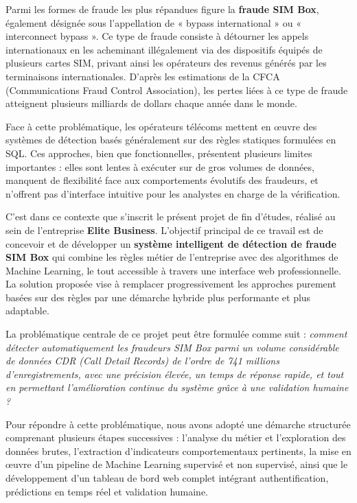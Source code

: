 \documentclass[12pt, oneside, a4paper]{report}
\begin{document}
Parmi les formes de fraude les plus répandues figure la \textbf{fraude SIM Box}, également désignée sous l'appellation de « bypass international » ou « interconnect bypass ». Ce type de fraude consiste à détourner les appels internationaux en les acheminant illégalement via des dispositifs équipés de plusieurs cartes SIM, privant ainsi les opérateurs des revenus générés par les terminaisons internationales. D'après les estimations de la CFCA (Communications Fraud Control Association), les pertes liées à ce type de fraude atteignent plusieurs milliards de dollars chaque année dans le monde.

Face à cette problématique, les opérateurs télécoms mettent en œuvre des systèmes de détection basés généralement sur des règles statiques formulées en SQL. Ces approches, bien que fonctionnelles, présentent plusieurs limites importantes : elles sont lentes à exécuter sur de gros volumes de données, manquent de flexibilité face aux comportements évolutifs des fraudeurs, et n'offrent pas d'interface intuitive pour les analystes en charge de la vérification.

C'est dans ce contexte que s'inscrit le présent projet de fin d'études, réalisé au sein de l'entreprise \textbf{Elite Business}. L'objectif principal de ce travail est de concevoir et de développer un \textbf{système intelligent de détection de fraude SIM Box} qui combine les règles métier de l'entreprise avec des algorithmes de Machine Learning, le tout accessible à travers une interface web professionnelle. La solution proposée vise à remplacer progressivement les approches purement basées sur des règles par une démarche hybride plus performante et plus adaptable.

La problématique centrale de ce projet peut être formulée comme suit : \textit{comment détecter automatiquement les fraudeurs SIM Box parmi un volume considérable de données CDR (Call Detail Records) de l'ordre de 741 millions d'enregistrements, avec une précision élevée, un temps de réponse rapide, et tout en permettant l'amélioration continue du système grâce à une validation humaine ?}

Pour répondre à cette problématique, nous avons adopté une démarche structurée comprenant plusieurs étapes successives : l'analyse du métier et l'exploration des données brutes, l'extraction d'indicateurs comportementaux pertinents, la mise en œuvre d'un pipeline de Machine Learning supervisé et non supervisé, ainsi que le développement d'un tableau de bord web complet intégrant authentification, prédictions en temps réel et validation humaine.
\end{document}
